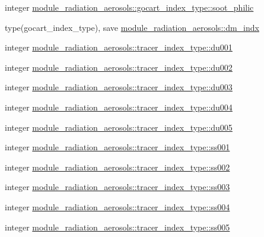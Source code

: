 \begin{DoxyCompactItemize}
\item 
integer \hyperlink{group__module__radiation__aerosols_gac382ab82531e2f1cb6021b786666f004}{module\+\_\+radiation\+\_\+aerosols\+::gocart\+\_\+index\+\_\+type\+::soot\+\_\+philic}
\item 
type(gocart\+\_\+index\+\_\+type), save \hyperlink{group__module__radiation__aerosols_ga70c58693c0aac6e4dbb6cf425fb0ce6a}{module\+\_\+radiation\+\_\+aerosols\+::dm\+\_\+indx}
\item 
integer \hyperlink{group__module__radiation__aerosols_gaf4355efd112704adbaeab5a3fd1d7912}{module\+\_\+radiation\+\_\+aerosols\+::tracer\+\_\+index\+\_\+type\+::du001}
\item 
integer \hyperlink{group__module__radiation__aerosols_gab68920703fa2cda7cbc42cb568a2ed56}{module\+\_\+radiation\+\_\+aerosols\+::tracer\+\_\+index\+\_\+type\+::du002}
\item 
integer \hyperlink{group__module__radiation__aerosols_ga9b2422518e2c8aaba9f0b64bd0c4676a}{module\+\_\+radiation\+\_\+aerosols\+::tracer\+\_\+index\+\_\+type\+::du003}
\item 
integer \hyperlink{group__module__radiation__aerosols_ga69658f70ffccecfae1751c227ec1b14c}{module\+\_\+radiation\+\_\+aerosols\+::tracer\+\_\+index\+\_\+type\+::du004}
\item 
integer \hyperlink{group__module__radiation__aerosols_gaabd67af89106955952b0010bb3a70e4e}{module\+\_\+radiation\+\_\+aerosols\+::tracer\+\_\+index\+\_\+type\+::du005}
\item 
integer \hyperlink{group__module__radiation__aerosols_gacce0ecff4d4e84dffc0c23965053ac36}{module\+\_\+radiation\+\_\+aerosols\+::tracer\+\_\+index\+\_\+type\+::ss001}
\item 
integer \hyperlink{group__module__radiation__aerosols_ga9e96ed67b1e072d97314bc9e6e09eee7}{module\+\_\+radiation\+\_\+aerosols\+::tracer\+\_\+index\+\_\+type\+::ss002}
\item 
integer \hyperlink{group__module__radiation__aerosols_ga5aef8974607bb85ae1a23598a402adfb}{module\+\_\+radiation\+\_\+aerosols\+::tracer\+\_\+index\+\_\+type\+::ss003}
\item 
integer \hyperlink{group__module__radiation__aerosols_ga88d0024b6f7f6fa3ae4e1da0e9ce7db8}{module\+\_\+radiation\+\_\+aerosols\+::tracer\+\_\+index\+\_\+type\+::ss004}
\item 
integer \hyperlink{group__module__radiation__aerosols_ga3c67144cb8aeedfb6c51c474a5072605}{module\+\_\+radiation\+\_\+aerosols\+::tracer\+\_\+index\+\_\+type\+::ss005}
\item 

\end{DoxyCompactItemize}
